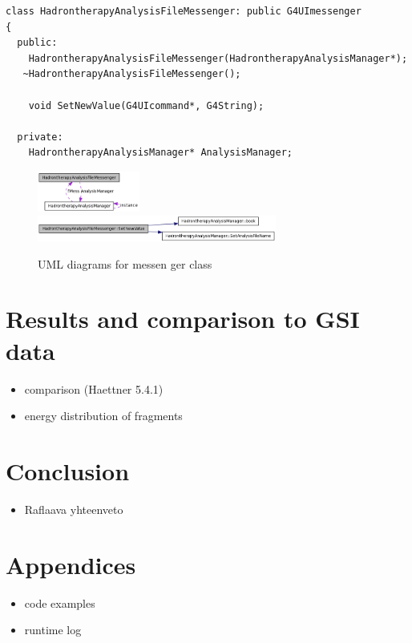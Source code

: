 \scriptsize
\begin{verbatim}
class HadrontherapyAnalysisFileMessenger: public G4UImessenger
{
  public:
    HadrontherapyAnalysisFileMessenger(HadrontherapyAnalysisManager*);
   ~HadrontherapyAnalysisFileMessenger();
    
    void SetNewValue(G4UIcommand*, G4String);
    
  private:
    HadrontherapyAnalysisManager* AnalysisManager;
\end{verbatim}
\normalsize
\begin{figure} 
\begin{center}
\includegraphics[width=0.3\textwidth]{images/setFileNameMessenger_1.png}  
\includegraphics[width=0.7\textwidth]{images/setFileNameMessenger_2.png}  
\caption{\label{fig:messengerUML} UML diagrams for messen ger class}
 
 \end{center}
 \end{figure}

\section{Results and comparison to GSI data}
\begin{itemize}
\item comparison (Haettner 5.4.1)
\item energy distribution of fragments
\end{itemize}

\section{Conclusion}
\begin{itemize}
\item Raflaava yhteenveto
\end{itemize}

\section{Appendices}
\begin{itemize}
\item code examples
\item runtime log
\end{itemize}





  


\else

\fi